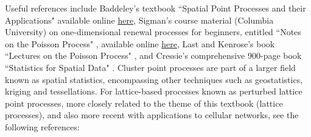 \documentclass[10pt]{article}
\begin{document}
Useful references include Baddeley's textbook ``Spatial Point Processes and their Applications" \cite{baddeley} available 
online \href{https://www.apps.stat.vt.edu/leman/VTCourses/BaddeleyPointProcesses.pdf}{here}, 
Sigman's course material (Columbia University) on one-dimensional \textcolor{index}{renewal processes} for beginners, entitled ``Notes on the Poisson Process" \cite{karl}, available online \href{http://www.columbia.edu/~ks20/stochastic-I/stochastic-I-PP.pdf}{here}, 
Last and Kenrose's book ``Lectures on the Poisson Process" \cite{campoi}, and Cressie's comprehensive 900-page book ``Statistics for Spatial Data" \cite{cressie}. Cluster point processes are part of a larger field known as 
\textcolor{index}{spatial statistics}, 
encompassing other techniques such as geostatistics, kriging and tessellations. For lattice-based processes known as 
\textcolor{index}{perturbed lattice point processes}, more closely related to the theme of this textbook (lattice processes), and also more recent with applications to cellular networks, see the following references:
\end{document}
